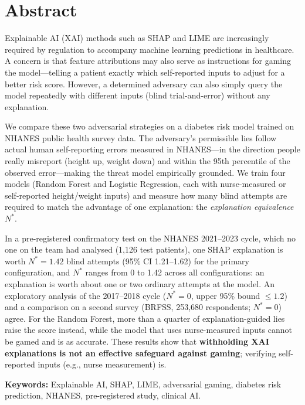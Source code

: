 \documentclass[12pt, a4paper, oneside]{report}
\theoremstyle{definition}
\begin{document}
\chapter*{Abstract}

Explainable AI (XAI) methods such as SHAP and LIME are increasingly
required by regulation to accompany machine learning predictions in
healthcare. A concern is that feature attributions may also serve as
instructions for gaming the model---telling a patient exactly which
self-reported inputs to adjust for a better risk score. However, a
determined adversary can also simply query the model repeatedly with
different inputs (blind trial-and-error) without any explanation.

We compare these two adversarial strategies on a diabetes risk model
trained on NHANES public health survey data. The adversary's permissible
lies follow actual human self-reporting errors measured in NHANES---in
the direction people really misreport (height up, weight down) and
within the 95th percentile of the observed error---making the threat
model empirically grounded.
We train four models (Random Forest and Logistic Regression, each with
nurse-measured or self-reported height/weight inputs) and measure how
many blind attempts are required to match the advantage of one explanation:
the \textit{explanation equivalence} $N^*$.

In a pre-registered confirmatory test on the NHANES 2021--2023 cycle,
which no one on the team had analysed (1,126 test patients), one SHAP
explanation is worth $N^* = 1.42$ blind attempts (95\% CI 1.21--1.62)
for the primary configuration, and $N^*$ ranges from 0 to 1.42 across
all configurations: an explanation is worth about one or two ordinary
attempts at the model. An exploratory analysis of the 2017--2018 cycle
($N^* = 0$, upper 95\% bound $\le 1.2$) and a comparison on a second
survey (BRFSS, 253,680 respondents; $N^* = 0$) agree. For the Random Forest, more than a
quarter of explanation-guided lies raise the score instead, while the
model that uses nurse-measured inputs cannot be gamed and is as
accurate. These results show that
\textbf{withholding XAI explanations is not an effective safeguard
against gaming}; verifying self-reported inputs (e.g., nurse
measurement) is.

\textbf{Keywords:} Explainable AI, SHAP, LIME, adversarial gaming, diabetes
risk prediction, NHANES, pre-registered study, clinical AI.
\end{document}
